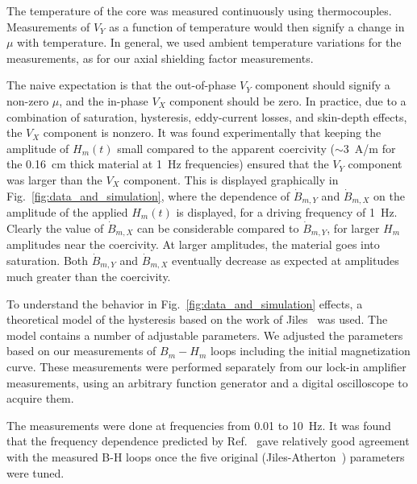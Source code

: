 The temperature of the core was measured continuously using
thermocouples.  Measurements of $V_Y$ as a function of temperature
would then signify a change in $\mu$ with temperature.  In general, we
used ambient temperature variations for the measurements, as for our
axial shielding factor measurements.


The naive expectation is that the out-of-phase $V_Y$ component should
signify a non-zero $\mu$, and the in-phase $V_X$ component should be
zero.  In practice, due to a combination of saturation, hysteresis,
eddy-current losses, and skin-depth effects, the $V_X$ component is
nonzero.  It was found experimentally that keeping the amplitude of
$H_m(t)$ small compared to the apparent coercivity ($\sim 3$~A/m for
the 0.16~cm thick material at 1~Hz frequencies) ensured that the $V_Y$
component was larger than the $V_X$ component.  This is displayed
graphically in Fig.~\ref{fig:data_and_simulation}, where the
dependence of $\dot{B}_{m,Y}$ and $\dot{B}_{m,X}$ on the amplitude of
the applied $H_m(t)$ is displayed, for a driving frequency of 1~Hz.
Clearly the value of $\dot{B}_{m,X}$ can be considerable compared to
$\dot{B}_{m,Y}$, for larger $H_m$ amplitudes near the coercivity.  At
larger amplitudes, the material goes into saturation.  Both
$\dot{B}_{m,Y}$ and $\dot{B}_{m,X}$ eventually decrease as expected at
amplitudes much greater than the coercivity.

To understand the behavior in Fig.~\ref{fig:data_and_simulation}
effects, a theoretical model of the hysteresis based on the work of
Jiles~\cite{bib:jiles} was used.  The model contains a number of
adjustable parameters.  We adjusted the parameters based on our
measurements of $B_m-H_m$ loops including the initial magnetization
curve.  These measurements were performed separately from our lock-in
amplifier measurements, using an arbitrary function generator and a
digital oscilloscope to acquire them.

The measurements were done at frequencies from 0.01 to 10~Hz.  It was
found that the frequency dependence predicted by Ref.~\cite{bib:jiles}
gave relatively good agreement with the measured B-H loops once the
five original (Jiles-Atherton~\cite{bib:jiles-atherton}) parameters
were tuned.

